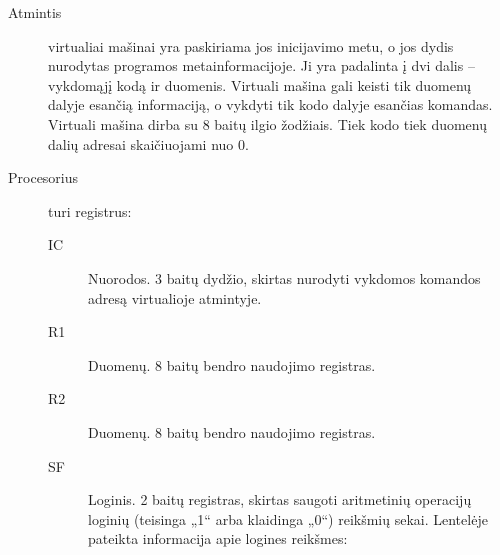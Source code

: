 \begin{description}
  \item[Atmintis] virtualiai mašinai yra paskiriama jos inicijavimo metu,
    o jos dydis nurodytas programos metainformacijoje.
    Ji yra padalinta į dvi dalis – vykdomąjį kodą ir duomenis. Virtuali
    mašina gali keisti tik duomenų dalyje esančią informaciją, o vykdyti
    tik kodo dalyje esančias komandas. Virtuali mašina dirba su 
    8 baitų ilgio žodžiais. Tiek kodo tiek duomenų dalių adresai 
    skaičiuojami nuo 0.
  \item[Procesorius] turi registrus:
    \begin{description}
      \item[IC] Nuorodos. 3 baitų dydžio, skirtas nurodyti vykdomos komandos
        adresą virtualioje atmintyje.
      \item[R1] Duomenų. 8 baitų bendro naudojimo registras.
      \item[R2] Duomenų. 8 baitų bendro naudojimo registras.
      \item[SF] Loginis. 2 baitų registras, skirtas saugoti aritmetinių 
        operacijų loginių (teisinga „1“ arba klaidinga „0“) reikšmių sekai. 
        Lentelėje pateikta informacija apie logines reikšmes:


\end{description}
\end{description}
